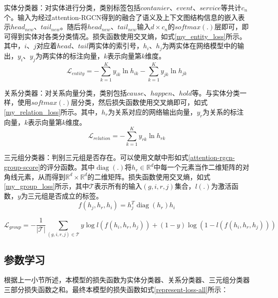实体分类器：对实体进行分类，类别标签包括$contanier$、$event$、$service$等共计$c_{n}$个。输入为经过attention-RGCN得到的融合了语义及上下文图结构信息的嵌入表示$head_{new}$、$tail_{new}$。随后将$head_{new}$、$tail_{new}$输入$d \times c_{n}$的$softmax(.)$层即可，即可得到实体对各类分类情况。损失函数使用交叉熵，如式\ref{my_entity_loss}所示。其中，$i$、$j$对应着$head$、$tail$两实体的索引号，$h_i$、$h_j$为两实体在网络模型中的输出，$y_i$、$y_j$为两实体的标注向量，$k$表示向量第$k$维度。
\begin{equation}
    \mathcal{L}_{entity}= - \sum_{k=1}^{K} y_{i k} \ln h_{i k} - \sum_{k=1}^{K} y_{j k} \ln h_{j k}
    \label{my_entity_loss}
\end{equation}

关系分类器：对关系向量分类，类别包括$cause$、$happen$、$hold$等。与实体分类一样，使用$softmax(.)$层分类，然后损失函数使用交叉熵即可，如式\ref{my_relation_loss}所示。其中，$h_r$为关系对应的网络输出向量，$y_r$为关系的标注向量，$k$表示向量第$k$维度。
\begin{equation}
    \mathcal{L}_{relation}=- \sum_{k=1}^{K} y_{r k} \ln h_{r k}
    \label{my_relation_loss}
\end{equation}

三元组分类器：判别三元组是否存在。可以使用文献\parencite{trouillon2016complex}中形如式\ref{attention-rgcn-group-score}的评分函数。其中$\operatorname{diag}\left(.\right)$将$h_r\in\mathbb{R}^{d}$中每一个元素当作二维矩阵的对角线元素，从而得到$\mathbb{R}^{d}\times \mathbb{R}^{d}$的二维矩阵。损失函数使用交叉熵，如式\ref{my_group_loss}所示，其中$\mathcal{T}$表示所有的输入$(g, i, r, j)$集合，$l(.)$为激活函数，$y$为三元组是否成立的标签。
\begin{equation}
    f(h_{j}, h_{r}, h_{i})=h_{j}^{T} \operatorname{diag}\left(h_{r}\right) h_{i}
    \label{attention-rgcn-group-score}
\end{equation}

\begin{equation}
    \mathcal{L}_{group}= -\frac{1}{|\mathcal{T}|}  \sum_{(g, i, r, j) \in \mathcal{T}} y \log l(f(h_i, h_r, h_j))+(1-y) \log (1-l(f(h_i, h_r, h_j)))
    \label{my_group_loss}
\end{equation}

\subsection{参数学习}\label{representation-paras-learn}
根据上一小节所述，本模型的损失函数为实体分类器、关系分类器、三元组分类器三部分损失函数之和。最终本模型的损失函数如式\ref{represent-loss-all}所示：

